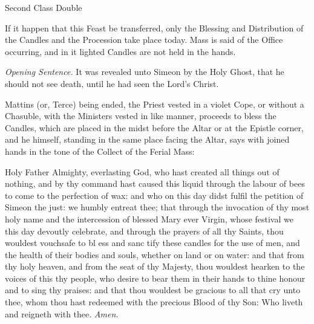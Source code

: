 \clearpage
{}


\vspace{-0.25\baselineskip}

\begin{inhead}
    {Second Class Double}
\end{inhead}

\vspace{-0.25\baselineskip}


\begin{rubric}
    If it happen that this Feast be transferred, only the Blessing and Distribution of the Candles and the Procession take place today. Mass is said of the Office occurring, and in it lighted Candles are not held in the hands.
\end{rubric}
\par\noindent
\textit{Opening Sentence.} It was revealed unto Simeon by the Holy Ghost, that he should not see death, until he had seen the Lord's Christ.

\begin{rubric}
    Mattins (or, Terce) being ended, the Priest vested in a violet Cope, or without a Chasuble, with the Ministers vested in like manner, proceeds to bless the Candles, which are placed in the midst before the Altar or at the Epistle corner, and he himself, standing in the same place facing the Altar, says with joined hands in the tone of the Collect of the Ferial Mass:
\end{rubric}
{} Holy Father Almighty, everlasting God, who hast created all things out of nothing, and by thy command hast caused this liquid through the labour of bees to come to the perfection of wax: and who on this day didst fulfil the petition of Simeon the just: we humbly entreat thee; that through the invocation of thy most holy name and the intercession of blessed Mary ever Virgin, whose festival we this day devoutly celebrate, and through the prayers of all thy Saints, thou wouldest vouchsafe to bl {} ess and sanc {} tify these candles for the use of men, and the health of their bodies and souls, whether on land or on water: and that from thy holy heaven, and from the seat of thy Majesty, thou wouldest hearken to the voices of this thy people, who desire to bear them in their hands to thine honour and to sing thy praises: and that thou wouldest be gracious to all that cry unto thee, whom thou hast redeemed with the precious Blood of thy Son: Who liveth and reigneth with thee. \textit{Amen.}

